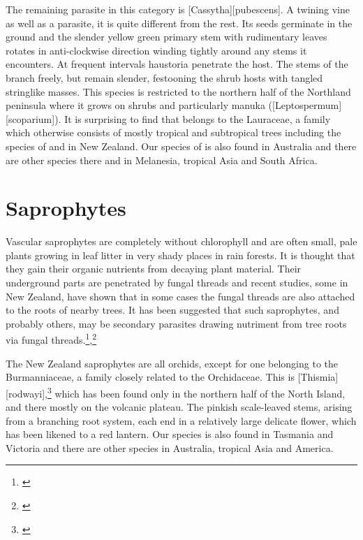 The remaining parasite in this category is [Cassytha][pubescens].
A twining vine as well as a parasite, it is quite different from the rest.
Its seeds germinate in the ground and the slender yellow green primary stem with rudimentary leaves rotates in anti-clockwise direction winding tightly around any stems it encounters.
At frequent intervals haustoria penetrate the host.
The stems of the  branch freely, but remain slender, festooning the shrub hosts with tangled stringlike masses.
This species is restricted to the northern half of the Northland peninsula where it grows on shrubs and particularly manuka ([Leptospermum][scoparium]).
It is surprising to find that  belongs to the Lauraceae, a family which otherwise consists of mostly tropical and subtropical trees including the species of  and  in New Zealand.
Our species of  is also found in Australia and there are other species there and in Melanesia, tropical Asia and South Africa.

\section{Saprophytes}

Vascular saprophytes are completely without chlorophyll and are often small, pale plants growing in leaf litter in very shady places in rain forests.
It is thought that they gain their organic nutrients from decaying plant material.
Their underground parts are penetrated by fungal threads and recent studies, some in New Zealand, have shown that in some cases the fungal threads are also attached to the roots of nearby trees.
It has been suggested that such saprophytes, and probably others, may be secondary parasites drawing nutriment from tree roots via fungal threads.\footnote{\cite{campbell1962mycorrhiza}},\footnote{\cite{campbell1968investigation}}

The New Zealand saprophytes are all orchids, except for one belonging to the Burmanniaceae, a family closely related to the Orchidaceae.
This is [Thismia][rodwayi],\footnote{\cite{campbell1968investigation}} which has been found only in the northern half of the North Island, and there mostly on the volcanic plateau.
The pinkish scale-leaved stems, arising from a branching root system, each end in a relatively large delicate flower, which has been likened to a red lantern.
Our species is also found in Tasmania and Victoria and there are other species in Australia, tropical Asia and America.


